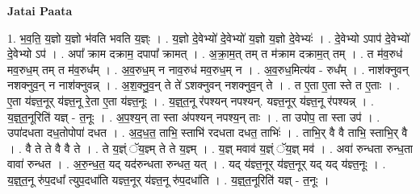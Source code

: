 \documentclass[17pt]{extarticle}
\begin{document}
\textbf{Jatai Paata} \newline

1. भ॒व॒ति॒ य॒ज्ञो य॒ज्ञो भ॑वति भवति य॒ज्ञ्ः । . य॒ज्ञो दे॒वेभ्यो॑ दे॒वेभ्यो॑ य॒ज्ञो य॒ज्ञो दे॒वेभ्यः॑ । . दे॒वेभ्यो ऽपाप॑ दे॒वेभ्यो॑ दे॒वेभ्यो ऽप॑ । . अपा᳚ क्राम दक्राम॒ दपापा᳚ क्रामत् । . अ॒क्रा॒म॒त् तम् त म॑क्राम दक्राम॒त् तम् । . त म॑व॒रुध॑ मव॒रुध॒म् तम् त म॑व॒रुध᳚म् । . अ॒व॒रुध॒म् न नाव॒रुध॑ मव॒रुध॒म् न । . अ॒व॒रुध॒मित्य॑व - रुध᳚म् । . नाश॑क्नुवन् नशक्नुव॒न् न नाश॑क्नुवन्न् । . अ॒श॒क्नु॒व॒न् ते ते॑ ऽशक्नुवन् नशक्नुव॒न् ते । . त ए॒ता ए॒ता स्ते त ए॒ताः । . ए॒ता य॑ज्ञ्त॒नूर् य॑ज्ञ्त॒नू रे॒ता ए॒ता य॑ज्ञ्त॒नूः । . य॒ज्ञ्॒त॒नू र॑पश्यन् नपश्यन्. यज्ञ्त॒नूर् य॑ज्ञ्त॒नू र॑पश्यन्न् । . य॒ज्ञ्॒त॒नूरिति॑ यज्ञ् - त॒नूः । . अ॒प॒श्य॒न् ता स्ता अ॑पश्यन् नपश्य॒न् ताः । . ता उपोप॒ ता स्ता उप॑ । . उपा॑दधता दध॒तोपोपा॑ दधत । . अ॒द॒ध॒त॒ ताभि॒ स्ताभि॑ रदधता दधत॒ ताभिः॑ । . ताभि॒र् वै वै ताभि॒ स्ताभि॒र् वै । . वै ते ते वै वै ते । . ते य॒ज्ञ्ं ॅय॒ज्ञ्म् ते ते य॒ज्ञ्म् । . य॒ज्ञ् मवाव॑ य॒ज्ञ्ं ॅय॒ज्ञ् मव॑ । . अवा॑ रुन्धता रुन्ध॒ता वावा॑ रुन्धत । . अ॒रु॒न्ध॒त॒ यद् यद॑रुन्धता रुन्धत॒ यत् । . यद् य॑ज्ञ्त॒नूर् य॑ज्ञ्त॒नूर् यद् यद् य॑ज्ञ्त॒नूः । . य॒ज्ञ्॒त॒नू रु॑प॒दधा᳚ त्युप॒दधा॑ति यज्ञ्त॒नूर् य॑ज्ञ्त॒नू रु॑प॒दधा॑ति । . य॒ज्ञ्॒त॒नूरिति॑ यज्ञ् - त॒नूः । \newline
\end{document}
